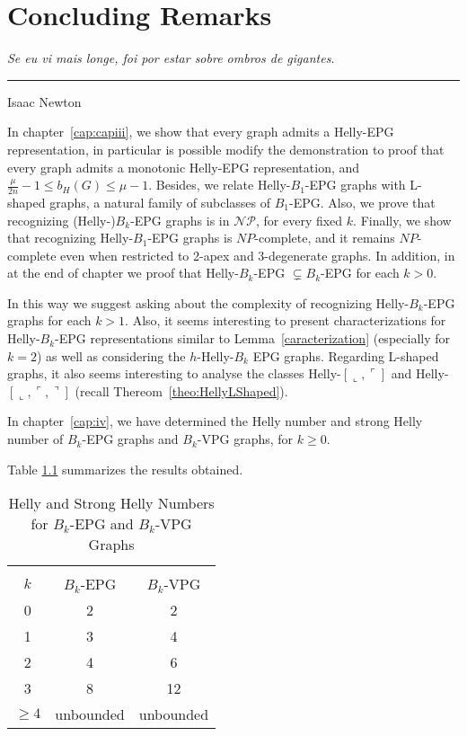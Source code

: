 \chapter{Concluding Remarks}\label{conclusao}

\begin{flushright}
\begin{minipage}[t][0cm][b]{0.47\textwidth}
\emph{
Se eu vi mais longe, foi por estar sobre ombros de gigantes.}
\end{minipage}

\rule[0cm]{7cm}{0.03cm}%

Isaac Newton
\end{flushright}


In chapter~\ref{cap:capiii}, we show that every graph admits a Helly-EPG representation, in particular is possible modify the demonstration to proof that every graph admits a monotonic Helly-EPG representation, and $\frac{\mu}{2n}-1\leq b_H(G)\leq \mu -1$. Besides, we relate Helly-$B_1$-EPG graphs with L-shaped graphs, a natural family of subclasses of $B_1$-EPG. Also, we prove that recognizing (Helly-)$B_k$-EPG graphs is in $\mathcal{NP}$, for every fixed $k$. Finally, we show that recognizing Helly-$B_1$-EPG graphs is $NP$-complete, and it remains $NP$-complete even when restricted to 2-apex and 3-degenerate graphs. In addition, in at the end of chapter we proof that
Helly-$B_k$-EPG $\subsetneq B_k$-EPG for each $k>0$.

In this way we suggest asking about the complexity of recognizing Helly-$B_k$-EPG graphs for each $k>1$. Also, it seems interesting to present characterizations for Helly-$B_k$-EPG representations similar to Lemma~\ref{caracterization} (especially for $k=2$) as well as considering the $h$-Helly-$B_k$ EPG graphs. Regarding L-shaped graphs, it also seems interesting to analyse the classes Helly-$[\llcorner, \ulcorner]$ and Helly-$[\llcorner, \ulcorner, \urcorner]$ (recall Thereom~\ref{theo:HellyLShaped}).

In chapter~\ref{cap:iv}, we have determined the Helly number and strong Helly number of $B_k$-EPG graphs and $B_k$-VPG graphs, for $k \geq 0$. 

Table \ref{tab:Helly-Strong-Helly2} summarizes the results obtained.
 
\Large 

\begin{table}[htb]
    \centering
    \caption{Helly and Strong Helly Numbers for $B_k$-EPG and $B_k$-VPG Graphs}
    \label{tab:Helly-Strong-Helly2}
    \begin{tabular}{c|c|c}
     \multicolumn{3}{c}{}\\
    \cline{1-3} $k$  & $B_k$-EPG & $B_k$-VPG \\
    \cline{1-3} 0 & 2 & 2 \\
    \cline{1-3} 1 & 3 & 4 \\
    \cline{1-3} 2 & 4 & 6 \\
    \cline{1-3} 3 & 8 & 12 \\
    \cline{1-3} $\geq 4$ & unbounded & unbounded \\
    \cline{1-3} 
    \end{tabular}
\end{table}

